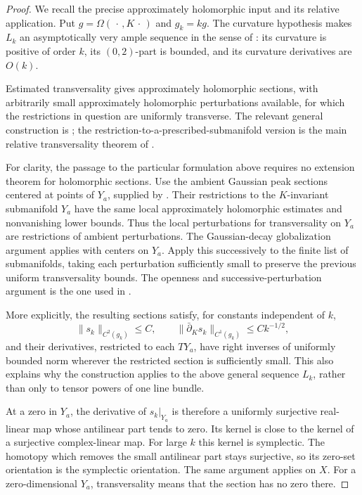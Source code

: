 \documentclass[11pt]{article}
\theoremstyle{definition}
\theoremstyle{remark}
\begin{document}
\begin{proof}
We recall the precise approximately holomorphic input and its
relative application.  Put $g=\Omega(\,\cdot\,,K\,\cdot\,)$ and
$g_k=kg$.  The curvature hypothesis makes $L_k$ an
asymptotically very ample sequence in the sense of
\cite[Definition~2.1]{Auroux01}: its curvature is positive of
order $k$, its $(0,2)$-part is bounded, and its curvature
derivatives are $O(k)$.

Estimated transversality gives approximately holomorphic sections,
with arbitrarily small approximately holomorphic perturbations
available, for which the restrictions in question are uniformly
transverse.  The relevant general construction is
\cite[Theorem~1.1 and Section~4]{Auroux01}; the
restriction-to-a-prescribed-submanifold version is the main
relative transversality theorem of \cite{Mohsen}.

For clarity, the passage to the particular formulation above
requires no extension theorem for holomorphic sections.
Use the ambient Gaussian peak sections centered at points of
$Y_a$, supplied by \cite[Lemma~2.3]{Auroux01}.  Their restrictions
to the $K$-invariant submanifold $Y_a$ have the same local
approximately holomorphic estimates and nonvanishing lower
bounds.  Thus the local perturbations for transversality on
$Y_a$ are restrictions of ambient perturbations.  The
Gaussian-decay globalization argument applies with centers on
$Y_a$.  Apply this successively to the finite list of submanifolds,
taking each perturbation sufficiently small to preserve the
previous uniform transversality bounds.  The openness and
successive-perturbation argument is the one used in
\cite[proof of Theorem~2]{Auroux97}.

More explicitly, the resulting sections satisfy, for constants
independent of $k$,
\[
\|s_k\|_{C^2(g_k)}\leq C,\qquad
\|\bar\partial_Ks_k\|_{C^1(g_k)}\leq Ck^{-1/2},
\]
and their derivatives, restricted to each $TY_a$, have right
inverses of uniformly bounded norm wherever the restricted
section is sufficiently small.  This also explains why the
construction applies to the above general sequence $L_k$, rather
than only to tensor powers of one line bundle.

At a zero in $Y_a$, the derivative of $s_k|_{Y_a}$ is therefore
a uniformly surjective real-linear map whose antilinear part
tends to zero.  Its kernel is close to the kernel of a surjective
complex-linear map.  For large $k$ this kernel is symplectic.
The homotopy which removes the small antilinear part stays
surjective, so its zero-set orientation is the symplectic
orientation.  The same argument applies on $X$.  For a
zero-dimensional $Y_a$, transversality means that the section
has no zero there.
\end{proof}
\end{document}
